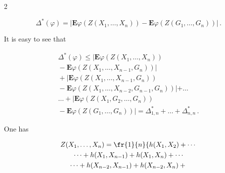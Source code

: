 \begin{multicols}{2}
    \vspace*{1pt}

    

    \noindent

    $$

    \Delta^{*}(\varphi)=|\mathbf{E}\varphi(Z(X_1,\ldots,X_n))-

    \mathbf{E}\varphi(Z(G_1,\ldots,G_n))|\,.

    $$

    It is easy to see that

    

    \noindent

    \begin{multline}

    \Delta^{*}(\varphi)\leq |\mathbf{E}\varphi(Z(X_1,\ldots,X_n))\\

    {}-

    \mathbf{E}\varphi(Z(X_1,\ldots,X_{n-1},G_n))|\\

{}+

    |\mathbf{E}\varphi(Z(X_1,\ldots,X_{n-1},G_n))\\

    {}-

    \mathbf{E}\varphi(Z(X_1,\ldots,X_{n-2},G_{n-1},G_n))|+\ldots{}

\\

\ldots{} +

     |\mathbf{E}\varphi(Z(X_1,G_{2},\ldots,G_n))\\

     {}-

     \mathbf{E}\varphi(Z(G_1,\ldots,G_n))|=\Delta^{*}_{1,n}+\ldots+\Delta^{*}_{n,n}\,.

     \label{e8-y}

     \end{multline}

One has



\noindent

    \begin{multline*}

    Z(X_1,\ldots,X_n)=\fr{1}{n}\{h(X_1,X_2)+\cdots{}\\

\cdots +h(X_1,X_{n-1})+h(X_1,X_n)+\cdots\\

\cdots+h(X_{n-2},X_{n-1})+h(X_{n-2},X_n)+{}\\


\end{multline*}
\end{multicols}
